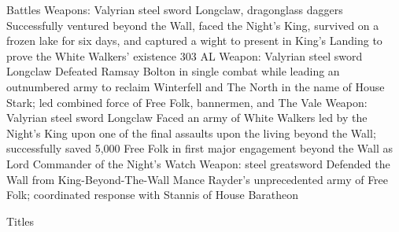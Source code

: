 \documentclass[]{rajatsresume}
\begin{document}
\begin{topic}{Battles}
    {Weapons: Valyrian steel sword Longclaw, dragonglass daggers}
    {Successfully ventured beyond the Wall, faced the Night's King,
    survived on a frozen lake for six days, and captured a wight to present
    in King's Landing to prove the White Walkers' existence}
    {303 AL}
    {Weapon: Valyrian steel sword Longclaw}
    {Defeated Ramsay Bolton in single combat while leading an outnumbered
    army to reclaim Winterfell and The North in the name of House Stark;
    led combined force of Free Folk, bannermen, and The Vale}
    {Weapon: Valyrian steel sword Longclaw}
    {Faced an army of White Walkers led by the Night's King upon one of the
    final assaults upon the living beyond the Wall; successfully saved 5,000
    Free Folk in first major engagement beyond the Wall as Lord Commander of
    the Night's Watch}
    {Weapon: steel greatsword}
    {Defended the Wall from King-Beyond-The-Wall Mance Rayder's unprecedented
    army of Free Folk; coordinated response with Stannis of House Baratheon}
\end{topic}

\begin{topic}{Titles}
\end{topic}
\end{document}
